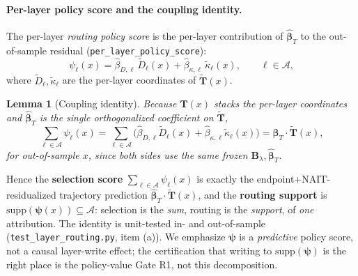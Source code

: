 \documentclass[11pt]{article}
\newtheorem{lemma}{Lemma}
\theoremstyle{definition}
\newcommand{\Tmat}{\mathbf{T}}
\newcommand{\Ttil}{\widetilde{\mathbf{T}}}
\newcommand{\Blam}{\mathbf{B}_{\lambda}}
\newcommand{\Aset}{\mathcal{A}}
\newcommand{\psivec}{\bm{\psi}}
\begin{document}
\paragraph{Per-layer policy score and the coupling identity.}
The per-layer \emph{routing policy score} is the per-layer contribution of $\hat{\bm\beta}_T$
to the out-of-sample residual (\texttt{per\_layer\_policy\_score}):
\begin{equation}
\psi_\ell(x)=\hat\beta_{D,\ell}\,\widetilde D_\ell(x)+\hat\beta_{\kappa,\ell}\,\widetilde\kappa_\ell(x),
\qquad \ell\in\Aset,
\label{eq:psi}
\end{equation}
where $\widetilde D_\ell,\widetilde\kappa_\ell$ are the per-layer coordinates of $\Ttil(x)$.
\begin{lemma}[Coupling identity]
\label{lem:couple}
Because $\Tmat(x)$ stacks the per-layer coordinates and $\hat{\bm\beta}_T$ is the single
orthogonalized coefficient on $\Ttil$,
\[
\sum_{\ell\in\Aset}\psi_\ell(x)=\sum_{\ell\in\Aset}\big(\hat\beta_{D,\ell}\widetilde D_\ell(x)+\hat\beta_{\kappa,\ell}\widetilde\kappa_\ell(x)\big)=\hat{\bm\beta}_T\cdot\Ttil(x),
\]
for \emph{out-of-sample} $x$, since both sides use the same frozen $\Blam,\hat{\bm\beta}_T$.
\end{lemma}
\noindent Hence the \textbf{selection score} $\sum_{\ell\in\Aset}\psi_\ell(x)$ is exactly the
endpoint+NAIT-residualized trajectory prediction $\hat{\bm\beta}_T\cdot\Ttil(x)$, and the
\textbf{routing support} is $\mathrm{supp}(\psivec(x))\subseteq\Aset$: selection is the
\emph{sum}, routing is the \emph{support}, of \emph{one} attribution. The identity is
unit-tested in- and out-of-sample (\texttt{test\_layer\_routing.py}, item (a)). We
emphasize $\psivec$ is a \emph{predictive} policy score, not a causal layer-write effect;
the certification that writing to $\mathrm{supp}(\psivec)$ is the right place is the
policy-value Gate R1, not this decomposition.
\end{document}
